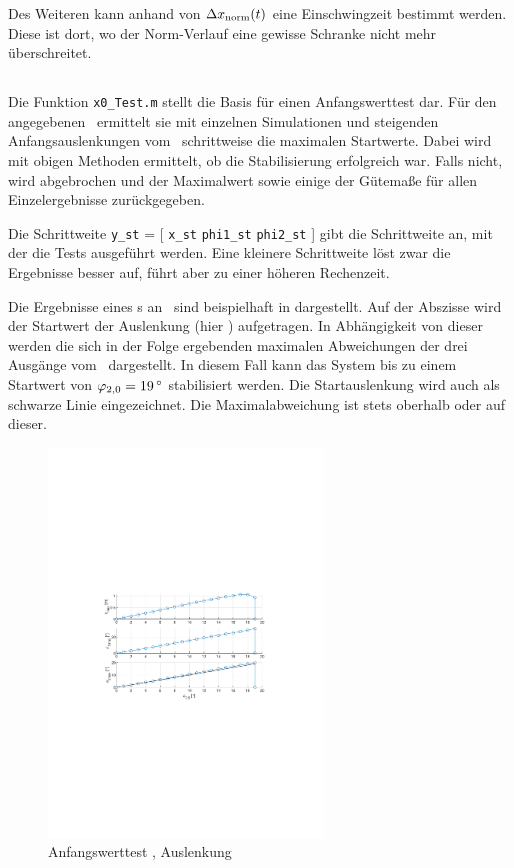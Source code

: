 Des Weiteren kann anhand von $\Delta x_{\mathrm{norm}}(t)$ eine Einschwingzeit bestimmt werden.
Diese ist dort, wo der Norm-Verlauf eine gewisse Schranke nicht mehr überschreitet.


\subsection{\xots}\label{subsec:awts}

Die Funktion \texttt{x0\_Test.m} stellt die Basis für einen Anfangswerttest dar.
Für den angegebenen \ap\ ermittelt sie mit einzelnen Simulationen und steigenden Anfangsauslenkungen vom \ap\ schrittweise die maximalen Startwerte.
Dabei wird mit obigen Methoden ermittelt, ob die Stabilisierung erfolgreich war.
Falls nicht, wird abgebrochen und der Maximalwert sowie einige der Gütemaße für allen Einzelergebnisse zurückgegeben.

Die Schrittweite \texttt{y\_st} = [ \texttt{x\_st} \texttt{phi1\_st} \texttt{phi2\_st} ] gibt die Schrittweite an, mit der die Tests ausgeführt werden.
Eine kleinere Schrittweite löst zwar die Ergebnisse besser auf, führt aber zu einer höheren Rechenzeit.

Die Ergebnisse eines \xots s an \apv\ sind beispielhaft in  dargestellt.
Auf der Abszisse wird der Startwert der Auslenkung (hier \phz) aufgetragen.
In Abhängigkeit von dieser werden die sich in der Folge ergebenden maximalen Abweichungen der drei Ausgänge vom \ap\ dargestellt.
In diesem Fall kann das System bis zu einem Startwert von $\phzo=\valdeg{19}$ stabilisiert werden.
Die Startauslenkung wird auch als schwarze Linie eingezeichnet. 
Die Maximalabweichung ist stets oberhalb oder auf dieser.

\begin{figure}[htbp]
	\centering
		\includegraphics[width=0.65\textwidth]{Bilder/x0test/appr-x0-ap42.pdf}
	\caption{Anfangswerttest \apv, Auslenkung \phz}
	\label{fig:x0test}
\end{figure}


